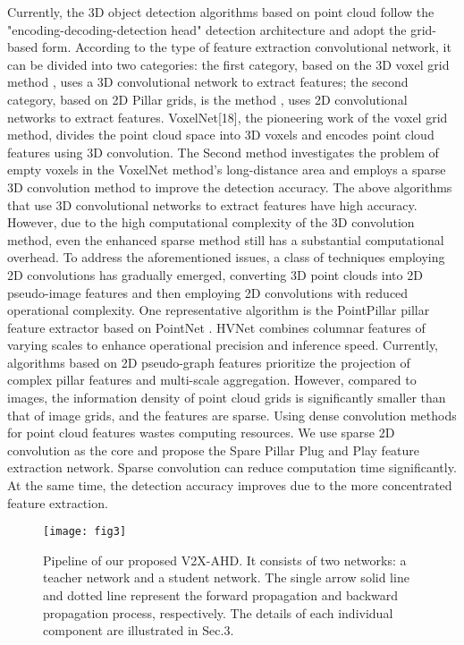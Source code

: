 \documentclass[lettersize,journal]{IEEEtran}
\begin{document}
Currently, the 3D object detection algorithms based on point cloud follow the "encoding-decoding-detection head" detection architecture and adopt the grid-based form. According to the type of feature extraction convolutional network, it can be divided into two categories: the first category, based on the 3D voxel grid method \cite{14}\cite{15}\cite{16}\cite{17}\cite{18}, uses a 3D convolutional network to extract features; the second category, based on 2D Pillar grids, is the method \cite{19}\cite{20}\cite{21}\cite{22}, uses 2D convolutional networks to extract features. 
VoxelNet[18], the pioneering work of the voxel grid method, divides the point cloud space into 3D voxels and encodes point cloud features using 3D convolution. The Second \cite{16} method investigates the problem of empty voxels in the VoxelNet method's long-distance area and employs a sparse 3D convolution method to improve the detection accuracy. The above algorithms that use 3D convolutional networks to extract features have high accuracy. However, due to the high computational complexity of the 3D convolution method, even the enhanced sparse method still has a substantial computational overhead. 
To address the aforementioned issues, a class of techniques employing 2D convolutions has gradually emerged, converting 3D point clouds into 2D pseudo-image features and then employing 2D convolutions with reduced operational complexity. One representative algorithm is the PointPillar \cite{19} pillar feature extractor based on PointNet \cite{23}. HVNet \cite{21} combines columnar features of varying scales to enhance operational precision and inference speed.
Currently, algorithms based on 2D pseudo-graph features prioritize the projection of complex pillar features and multi-scale aggregation. However, compared to images, the information density of point cloud grids is significantly smaller than that of image grids, and the features are sparse. Using dense convolution methods for point cloud features wastes computing resources. We use sparse 2D convolution as the core and propose the Spare Pillar Plug and Play feature extraction network. Sparse convolution can reduce computation time significantly. At the same time, the detection accuracy improves due to the more concentrated feature extraction.

\begin{figure*}[!t]
\centering
\texttt{[image: fig3]}
\caption{Pipeline of our proposed V2X-AHD. It consists of two networks: a  teacher network and a student network. The single arrow solid line and dotted line represent the forward propagation and backward propagation process, respectively. The details of each individual component are illustrated in Sec.3.}
\label{fig_3}
\end{figure*}
\end{document}
